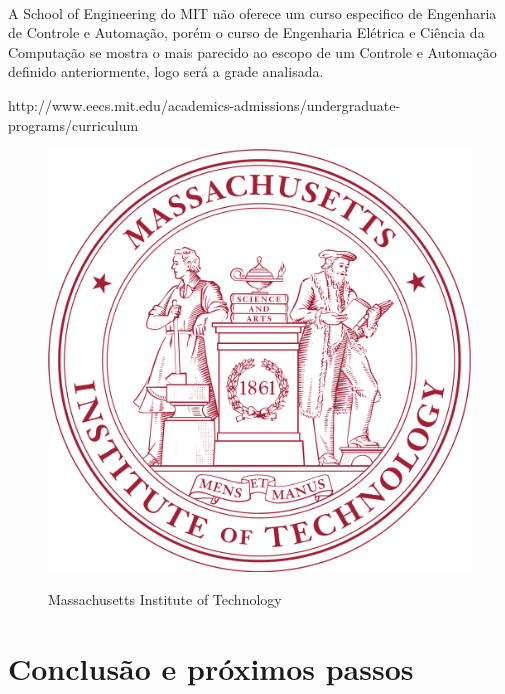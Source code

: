 \documentclass[12pt]{article} %
\begin{document}
\paragraph{} A School of Engineering do MIT não oferece um curso especifico de Engenharia de Controle e Automação, porém o curso de Engenharia Elétrica e Ciência da Computação se mostra o mais parecido ao escopo de um Controle e Automação definido anteriormente, logo será
a grade analisada.

http://www.eecs.mit.edu/academics-admissions/undergraduate-programs/curriculum

\begin{figure}[H]
\centering
\includegraphics[scale=0.2]{pictures/mitLogo.png}\\
\caption{Massachusetts Institute of Technology}
\end{figure}


\section{Conclusão e próximos passos}
\end{document}
